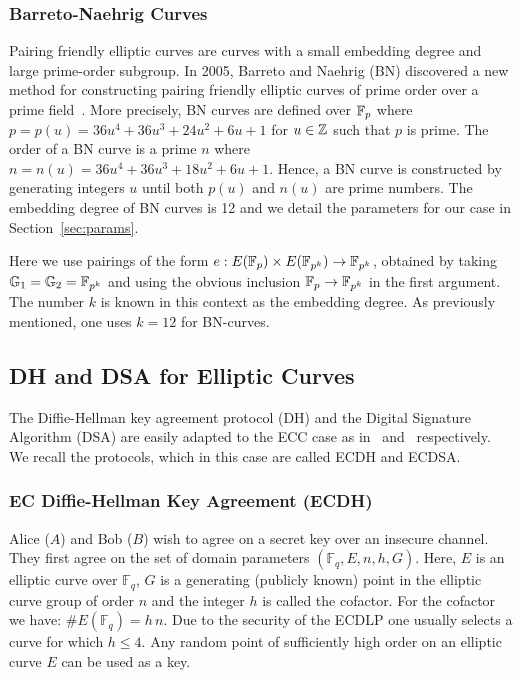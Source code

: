 \subsubsection{Barreto-Naehrig Curves}

Pairing friendly elliptic curves are curves with a small embedding degree and
large prime-order subgroup. In 2005, Barreto and Naehrig (BN) discovered a new
method for constructing pairing friendly elliptic curves of prime order over a
prime field~\cite{BN06}. More precisely, BN curves are defined over $\mathbb{F}_{p}$
where $p = p(u) = 36 u^4 + 36 u^3 + 24 u^2 + 6 u + 1$ for $u \in \mathbb{Z}$ such that
$p$ is prime. The order of a BN curve is a prime $n$ where
$n = n(u) = 36 u^4 + 36 u^3 + 18 u^2 + 6 u + 1$. Hence, a BN curve is
constructed by generating integers $u$ until both $p(u)$ and $n(u)$ are prime
numbers. The embedding degree of BN curves is 12 and we detail the parameters
for our case in Section~\ref{sec:params}.

Here we use pairings of the form $e: E(\mathbb{F}_{p}) \times E(\mathbb{F}_{p^k}) \to \mathbb{F}_{p^k}$,
obtained by taking $\mathbb{G}_{1} = \mathbb{G}_{2} = \mathbb{F}_{p^k}$ and using the obvious inclusion
$\mathbb{F}_{p} \to \mathbb{F}_{p^k}$ in the first argument. The number $k$ is known in this
context as the embedding degree. As previously mentioned, one uses $k = 12$ for
BN-curves.

\subsection{DH and DSA for Elliptic Curves}\label{sec:dhdsa}

The Diffie-Hellman key agreement protocol (DH) and the Digital Signature
Algorithm (DSA) are easily adapted to the ECC case as in~\cite{BSS05}
and~\cite{JM00} respectively. We recall the protocols, which in this case are
called ECDH and ECDSA.

\subsubsection{EC Diffie-Hellman Key Agreement (ECDH)}

Alice ($A$) and Bob ($B$) wish to agree on a
secret key over an insecure channel. They first agree on the set
of domain parameters $(\mathbb{F}_q, E, n,
h, G)$. Here, $E$ is an elliptic curve over
$\mathbb{F}_q$, $G$ is a generating (publicly known) point in
the elliptic curve group of order $n$ and the integer
$h$ is called the cofactor. For the cofactor we have:
$\# E(\mathbb{F}_q) = h \, n.$
Due to the security of the ECDLP one usually
selects a curve for which $h \leq 4$.
Any random point of sufficiently high order on
an elliptic curve $E$ can be used as a key.

